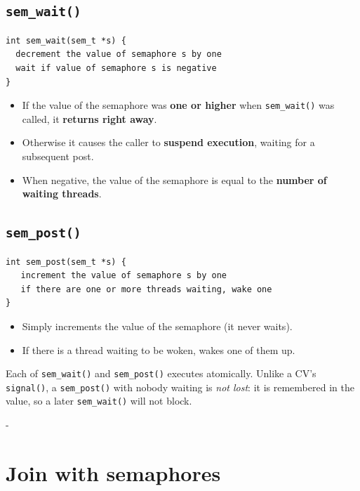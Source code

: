 \documentclass[11pt,a4paper]{article}
\makeatletter
\newcommand{\keepspace}[1]{\par\penalty-100\begingroup
  \setlength{\dimen@}{#1}\dimen@ii\pagegoal\advance\dimen@ii-\pagetotal
  \ifdim\dimen@>\dimen@ii\ifdim\dimen@ii>\z@\vfil\fi\break\fi\endgroup}
\makeatother
\begin{document}
\subsection{\texttt{sem\_wait()}}

\begin{lstlisting}
int sem_wait(sem_t *s) {
  decrement the value of semaphore s by one
  wait if value of semaphore s is negative
}
\end{lstlisting}
\begin{itemize}
  \item If the value of the semaphore was \textbf{one or higher} when
        \texttt{sem\_wait()} was called, it \textbf{returns right away}.
  \item Otherwise it causes the caller to \textbf{suspend execution},
        waiting for a subsequent post.
  \item When negative, the value of the semaphore is equal to the
        \textbf{number of waiting threads}.
\end{itemize}

\subsection{\texttt{sem\_post()}}

\begin{lstlisting}
int sem_post(sem_t *s) {
   increment the value of semaphore s by one
   if there are one or more threads waiting, wake one
}
\end{lstlisting}
\begin{itemize}
  \item Simply increments the value of the semaphore (it never waits).
  \item If there is a thread waiting to be woken, wakes one of them up.
\end{itemize}

\begin{keybox}
Each of \texttt{sem\_wait()} and \texttt{sem\_post()} executes atomically.
Unlike a CV's \texttt{signal()}, a \texttt{sem\_post()} with nobody waiting
is \emph{not lost}: it is remembered in the value, so a later
\texttt{sem\_wait()} will not block.
\end{keybox}

\keepspace{22\baselineskip}
\section{Join with semaphores}
\end{document}
